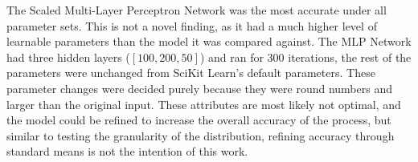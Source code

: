 The Scaled Multi-Layer Perceptron Network was the most accurate under all parameter sets. This is not a novel finding,
as it had a much higher level of learnable parameters than the model it was compared against. The MLP Network had three
hidden layers ($[100, 200, 50]$) and ran for 300 iterations, the rest of the parameters were unchanged from SciKit Learn’s
default parameters. These parameter changes were decided purely because they were round numbers and larger than the
original input. These attributes are most likely not optimal, and the model could be refined to increase the overall
accuracy of the process, but similar to testing the granularity of the distribution, refining accuracy through standard
means is not the intention of this work.